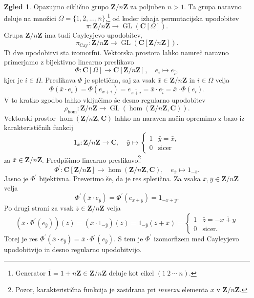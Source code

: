 \documentclass[11pt]{book}
\def\ZZ{\mathbf{Z}}
\def\CC{\mathbf{C}}
\DeclareMathOperator\GL{GL}
\DeclareMathOperator\Cay{Cay}
\theoremstyle{definition}
\theoremstyle{zgled}
\newtheorem*{zgled}{Zgled}
\theoremstyle{odprtproblem}
\theoremstyle{domacanaloga}
\theoremstyle{izrek}
\begin{document}
\begin{zgled}
    Opazujmo ciklično grupo $\ZZ/n\ZZ$ za poljuben $n > 1$.
    Ta grupa naravno deluje na množici $\Omega = \{ 1, 2, \dots, n \}$,\footnote{Generator $\bar 1 = 1 + n\ZZ \in \ZZ/n\ZZ$ deluje kot cikel $(1 \ 2 \ \cdots \ n)$.} od koder izhaja permutacijska upodobitev
    \[
        \pi \colon \ZZ/n\ZZ \to \GL(\CC[\Omega]).
    \]
    Grupa $\ZZ/n\ZZ$ ima tudi Cayleyjevo upodobitev,
    \[
        \pi_{\Cay} \colon \ZZ/n\ZZ \to \GL(\CC[\ZZ/n\ZZ]).
    \]
    Ti dve upodobitvi sta izomorfni. Vektorska prostora lahko namreč naravno primerjamo z bijektivno linearno preslikavo
    \[
        \Phi \colon \CC[\Omega] \to \CC[\ZZ/n\ZZ], \quad    
        e_i \mapsto e_{\bar i},
    \]
    kjer je $i \in \Omega$. Preslikava $\Phi$ je spletična, saj za vsak $\bar x \in \ZZ/n\ZZ$ in $i \in \Omega$ velja
    \[
        \Phi(\bar x \cdot e_i) 
        = \Phi(e_{x + i})
        = e_{\overline{x + i}}
        = \bar x \cdot e_{\bar i}
        = \bar x \cdot \Phi(e_i).
    \]
    V to kratko zgodbo lahko vključimo še desno regularno upodobitev
    \[
        \rho_{\hom} \colon \ZZ/n\ZZ \to \GL(\hom(\ZZ/n\ZZ,\CC)).
    \]
    Vektorski prostor $\hom(\ZZ/n\ZZ, \CC)$ lahko na naraven način opremimo z bazo iz karakterističnih funkcij
    \[
        1_{\bar x} \colon \ZZ/n\ZZ \to \CC, \quad
        \bar y \mapsto \begin{cases}
            1 & \bar y = \bar x, \\
            0 & \text{sicer}
        \end{cases}
    \]
    za $\bar x \in \ZZ/n\ZZ$. Predpišimo linearno preslikavo\footnote{Pozor, karakteristična funkcija je zasidrana pri {\em inverzu} elementa $\bar x$ v $\ZZ/n\ZZ$.}
    \[
        \Phi^\prime \colon \CC[\ZZ/n\ZZ] \to \hom(\ZZ/n\ZZ, \CC), \quad
        e_{\bar x} \mapsto 1_{- \bar x}.
    \]
    Jasno je $\Phi^\prime$ bijektivna. Preverimo še, da je res spletična. Za vsaka $\bar x, \bar y \in \ZZ/n\ZZ$ velja
    \[
        \Phi^\prime(\bar x \cdot e_{\bar y})
        = \Phi^\prime(e_{\overline{x + y}})
        = 1_{- \overline{x + y}}.
    \]
    Po drugi strani za vsak $\bar z \in \ZZ/n\ZZ$ velja
    \[
        \left( \bar x \cdot \Phi^\prime(e_{\bar y}) \right) (\bar z)
        = \left( \bar x \cdot 1_{- \bar y} \right) (\bar z)
        = 1_{- \bar y}(\bar z + \bar x)
        = \begin{cases}
            1 & \bar z = - \overline{x + y} \\
            0 & \text{sicer}.
        \end{cases}
    \]
    Torej je res $\Phi^\prime(\bar x \cdot e_{\bar y}) = \bar x \cdot \Phi^\prime(e_{\bar y})$. S tem je $\Phi^\prime$ izomorfizem med Cayleyjevo upodobitvijo in desno regularno upodobitvijo.
\end{zgled}
\end{document}
